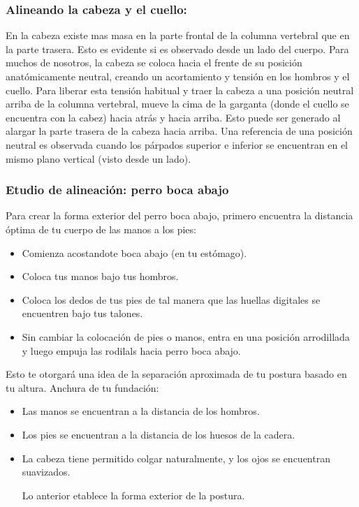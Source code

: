\subsubsection{Alineando la cabeza y el cuello:}
En la cabeza existe mas masa en la parte frontal de la columna vertebral que en la parte trasera. Esto es evidente si es observado desde un lado del cuerpo. Para muchos de nosotros, la cabeza se coloca hacia el frente de su posición anatómicamente neutral, creando un acortamiento y tensión en los hombros y el cuello. Para liberar esta tensión habitual y traer la cabeza a una posición neutral arriba de la columna vertebral, mueve la cima de la garganta (donde el cuello se encuentra con la cabez) hacia atrás y hacia arriba. Esto puede ser generado al alargar la parte trasera de la cabeza hacia arriba. Una referencia de una posición neutral es observada cuando los párpados superior e inferior  se encuentran en el mismo plano vertical (visto desde un lado).

\subsubsection{Etudio de alineación: perro boca abajo}
Para crear la forma exterior del perro boca abajo, primero encuentra la distancia óptima de tu cuerpo de las manos a los pies:
\begin{itemize}
	\item Comienza acostandote boca abajo (en tu estómago).
	\item Coloca tus manos bajo tus hombros.
	\item Coloca los dedos de tus pies de tal manera que las huellas digitales se encuentren bajo tus talones.
	\item Sin cambiar la colocación de pies o manos, entra en una posición arrodillada y luego empuja las rodilals hacia perro boca abajo.
\end{itemize}

Esto te otorgará una idea de la separación aproximada de tu postura basado en tu altura. Anchura de tu fundación:
\begin{itemize}
	\item Las manos se encuentran a la distancia de los hombros.
	\item Los pies se encuentran a la distancia de los huesos de la cadera.
	\item La cabeza tiene permitido colgar naturalmente, y los ojos se encuentran suavizados.

Lo anterior etablece la forma exterior de la postura.
\end{itemize}

